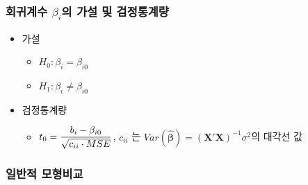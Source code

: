 \documentclass[
]{article}
\providecommand{\tightlist}{%
  \setlength{\itemsep}{0pt}\setlength{\parskip}{0pt}}
\begin{document}
\hypertarget{uxd68cuxadc0uxacc4uxc218-beta_iuxc758-uxac00uxc124-uxbc0f-uxac80uxc815uxd1b5uxacc4uxb7c9}{%
\subsubsection{\texorpdfstring{회귀계수 \(\beta_i\)의 가설 및
검정통계량}{회귀계수 \textbackslash beta\_i의 가설 및 검정통계량}}\label{uxd68cuxadc0uxacc4uxc218-beta_iuxc758-uxac00uxc124-uxbc0f-uxac80uxc815uxd1b5uxacc4uxb7c9}}

\begin{itemize}
\tightlist
\item
  가설

  \begin{itemize}
  \tightlist
  \item
    \(H_0 : \beta_i = \beta_{i0}\)
  \item
    \(H_1 : \beta_i \ne \beta_{i0}\)
  \end{itemize}
\item
  검정통계량

  \begin{itemize}
  \tightlist
  \item
    \(\begin{aligned} t_0={b_i - \beta_{i0} \over \sqrt{c_{ii}\cdot MSE}} \end{aligned}\),
    \(c_{ii}\) 는
    \(Var(\boldsymbol{\hat{\beta}})= (\boldsymbol{X'X})^{-1}\sigma^2\)의
    대각선 값
  \end{itemize}
\end{itemize}

\hypertarget{uxc77cuxbc18uxc801-uxbaa8uxd615uxbe44uxad50}{%
\subsubsection{일반적
모형비교}\label{uxc77cuxbc18uxc801-uxbaa8uxd615uxbe44uxad50}}
\end{document}
